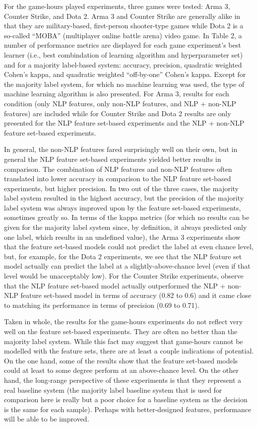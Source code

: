 \documentclass[9pt]{article}
\begin{document}
For the game-hours played experiments, three games were tested: Arma 3, Counter Strike, and Dota 2. Arma 3 and Counter Strike are generally alike in that they are military-based, first-person shooter-type games while Dota 2 is a so-called ``MOBA'' (multiplayer online battle arena) video game. In Table 2, a number of performance metrics are displayed for each game experiment's best learner (i.e., best combindation of learning algorithm and hyperparameter set) and for a majority label-based system: accuracy, precision, quadratic weighted Cohen's kappa, and quadratic weighted ``off-by-one'' Cohen's kappa. Except for the majority label system, for which no machine learning was used, the type of machine learning algorithm is also presented. For Arma 3, results for each condition (only NLP features, only non-NLP features, and NLP + non-NLP features) are included while for Counter Strike and Dota 2 results are only presented for the NLP feature set-based experiments and the NLP + non-NLP feature set-based experiments.

In general, the non-NLP features fared surprisingly well on their own, but in general the NLP feature set-based experiments yielded better results in comparison. The combination of NLP features and non-NLP features often translated into lower accuracy in comparison to the NLP feature set-based experiments, but higher precision. In two out of the three cases, the majority label system resulted in the highest accuracy, but the precision of the majority label system was always improved upon by the feature set-based experiments, sometimes greatly so. In terms of the kappa metrics (for which no results can be given for the majority label system since, by definition, it always predicted only one label, which results in an undefined value), the Arma 3 experiments show that the feature set-based models could not predict the label at even chance level, but, for example, for the Dota 2 experiments, we see that the NLP feature set model actually can predict the label at a slightly-above-chance level (even if that level would be unacceptably low). For the Counter Strike experiments, observe that the NLP feature set-based model actually outperformed the NLP + non-NLP feature set-based model in terms of accuracy (0.82 to 0.6) and it came close to matching its performance in terms of precision (0.69 to 0.71).

Taken in whole, the results for the game-hours experiments do not reflect very well on the feature set-based experiments. They are often no better than the majority label system. While this fact may suggest that game-hours cannot be modelled with the feature sets, there are at least a couple indications of potential. On the one hand, some of the results show that the feature set-based models could at least to some degree perform at an above-chance level. On the other hand, the long-range perspective of these experiments is that they represent a real baseline system (the majority label baseline system that is used for comparison here is really but a poor choice for a baseline system as the decision is the same for each sample). Perhaps with better-designed features, performance will be able to be improved.
\end{document}
